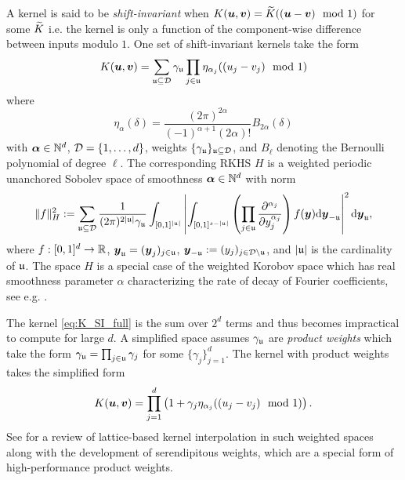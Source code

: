 \documentclass[acmsmall]{acmart}
\begin{document}
A kernel is said to be \emph{shift-invariant} when $K({\boldsymbol{u}},{\boldsymbol{v}}) = {\widetilde{K}}(({\boldsymbol{u}}-{\boldsymbol{v}}) \mod 1)$ for some ${\widetilde{K}}$ i.e. the kernel is only a function of the component-wise difference between inputs modulo $1$. One set of shift-invariant kernels take the form 
\begin{equation}
    K({\boldsymbol{u}},{\boldsymbol{v}}) = \sum_{{\mathfrak{u}} \subseteq {\mathcal{D}}} \gamma_{\mathfrak{u}} \prod_{j \in {\mathfrak{u}}} \eta_{\alpha_j}((u_j - v_j) \mod 1)
    \label{eq:K_SI_full}
\end{equation}
where 
$$\eta_\alpha(\delta) = \frac{(2\pi)^{2\alpha}}{(-1)^{\alpha+1}(2\alpha)!} B_{2\alpha}(\delta)$$
with ${\boldsymbol{\alpha}} \in {\mathbb{N}}^d$, ${\mathcal{D}} = \{1,\dots,d\}$, weights $\{\gamma_{\mathfrak{u}}\}_{{\mathfrak{u}} \subseteq {\mathcal{D}}}$, and $B_\ell$ denoting the Bernoulli polynomial of degree $\ell$. The corresponding RKHS $H$ is a weighted periodic unanchored Sobolev space of smoothness ${\boldsymbol{\alpha}} \in {\mathbb{N}}^d$ with norm 
$$\lVert f \rVert_H^2 := \sum_{{\mathfrak{u}} \subseteq {\mathcal{D}}} \frac{1}{(2 \pi)^{2 \lvert {\mathfrak{u}} \rvert}\gamma_{\mathfrak{u}}} \int_{[0,1]^{\lvert {\mathfrak{u}} \rvert}} \left\lvert \int_{[0,1]^{s - \lvert {\mathfrak{u}} \rvert}} \left(\prod_{j \in {\mathfrak{u}}} \frac{\partial^{\alpha_j}}{\partial y_j^{\alpha_j}}\right) f({\boldsymbol{y}}) \mathrm{d} {\boldsymbol{y}}_{- {\mathfrak{u}}} \right\rvert^2 \mathrm{d} {\boldsymbol{y}}_{\mathfrak{u}}, $$
where $f:[0,1]^d \to {\mathbb{R}}$, ${\boldsymbol{y}}_{\mathfrak{u}} = ({\boldsymbol{y}}_j)_{j \in {\mathfrak{u}}}$, ${\boldsymbol{y}}_{-{\mathfrak{u}}} := (y_j)_{j \in {\mathcal{D}} \setminus {\mathfrak{u}}}$, and $\lvert {\mathfrak{u}} \rvert$ is the cardinality of ${\mathfrak{u}}$. The space $H$ is a special case of the weighted Korobov space which has real smoothness parameter $\alpha$ characterizing the rate of decay of Fourier coefficients, see e.g. \citep{kaarnioja.kernel_interpolants_lattice_rkhs,kaarnioja.kernel_interpolants_lattice_rkhs_serendipitous,cools2021fast,cools2020lattice,sloan2001tractability,kuo2004lattice}.

The kernel \eqref{eq:K_SI_full} is the sum over $2^d$ terms and thus becomes impractical to compute for large $d$. A simplified space assumes $\gamma_{\mathfrak{u}}$ are \emph{product weights} which take the form $\gamma_{\mathfrak{u}} = \prod_{j \in {\mathfrak{u}}} \gamma_j$ for some $\{\gamma_j\}_{j=1}^d$. The kernel with product weights takes the simplified form 
\begin{equation}
    K({\boldsymbol{u}},{\boldsymbol{v}}) = \prod_{j=1}^d \left(1+\gamma_j \eta_{\alpha_j}((u_j-v_j) \mod 1)\right).
    \label{eq:K_SI_prod}
\end{equation}
See \citep{kaarnioja.kernel_interpolants_lattice_rkhs_serendipitous} for a review of lattice-based kernel interpolation in such weighted spaces along with the development of serendipitous weights, which are a special form of high-performance product weights. 
\end{document}
